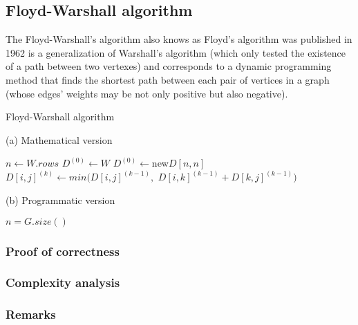 \subsection{Floyd-Warshall algorithm} \label{algorithm-shortestpath-floydwarshall}
The Floyd-Warshall's algorithm also knows as Floyd's algorithm was published in 1962 is a generalization of Warshall's algorithm 
(which only tested the existence of a path between two vertexes) and corresponds to a dynamic programming method 
that finds the shortest path between each pair of vertices in a graph (whose edges' weights may be not only positive but also negative).

\begin{algorithm}[ht]
    \caption{Floyd-Warshall algorithm}
    \label{alg:floyd-warshall}
    \begin{minipage}[t]{0.49\linewidth}
        (a) Mathematical version
        \begin{algorithmic}[1]
                \State $n \gets W.rows$
                \State $D^{(0)} \gets W$
                    \State $D^{(0)} \gets $new$ D[n, n]$
                            \State $D[i,j]^{(k)} \gets min( D[i,j]^{(k-1)},$
                            $D[i,k]^{(k-1)} + D[k,j]^{(k-1)} )$
                        \EndFor
                    \EndFor
                \EndFor
                \State {}
            \EndFunction
        \end{algorithmic}
    \end{minipage}
    \begin{minipage}[t]{0.49\linewidth}
        (b) Programmatic version
        \begin{algorithmic}[1]
            \State $n = G.size()$
            \EndFunction
        \end{algorithmic}
    \end{minipage}
\end{algorithm}
\subsubsection{Proof of correctness}

\subsubsection{Complexity analysis}

\subsubsection{Remarks}
